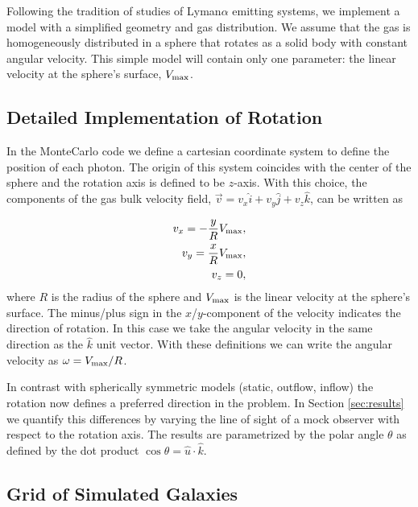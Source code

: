 \documentclass[usenatbib]{mn2e}
\begin{document}
Following the tradition of studies of Lyman$\alpha$ emitting systems,
we implement a model with a simplified geometry and gas
distribution. We assume that the gas is homogeneously distributed in a
sphere that rotates as a solid body with constant angular
velocity. This simple model will contain only one parameter: the
linear velocity at the sphere's surface, $V_{\rm max}$.

\subsection{Detailed Implementation of Rotation}

 In the MonteCarlo code we define a cartesian coordinate system to
 define the position of each photon. The origin of this system
 coincides with the center of the sphere and the rotation axis is defined
 to be $z$-axis. With this choice, the components of the gas bulk velocity
 field, $\vec{v} = v_{x}\hat{i} + v_{y}\hat{j} + v_{z}\hat{k}$, can be
 written as  
  
\begin{subequations}
\begin{align}
    v_{x}=-\dfrac{y}{R}V_{\rm max}, \label{subeq1}\\
    v_{y}=\dfrac{x}{R}V_{\rm max}, \label{subeq2}\\
    v_{z}=0, \label{subeq3}
\end{align}
\end{subequations}
%
where $R$ is the radius of the sphere and $V_{\rm max}$ is the linear
velocity at the sphere's surface. The minus/plus sign in the
$x$/$y$-component of the velocity indicates the direction of
rotation. In this case we take the angular velocity in the same
direction as the $\hat{k}$ unit vector. With these definitions we can
write the angular velocity as $\omega=V_{\rm max}/R$.  

In contrast with spherically symmetric models (static, outflow,
inflow) the rotation now defines a preferred direction in the
problem. In Section \ref{sec:results} we quantify this differences by
varying the line of sight of a mock observer with respect to the
rotation axis. The results are parametrized by the polar angle
$\theta$ as defined by the dot product $\cos\theta =
{\hat{u}\cdot\hat{k}}$. 

\subsection{Grid of Simulated Galaxies}
\label{sec:models}
\end{document}
